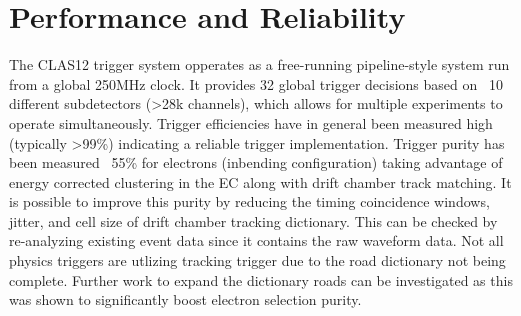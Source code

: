 \section{Performance and Reliability}

The CLAS12 trigger system opperates as a free-running pipeline-style system run from a global 250MHz clock. It provides 32 global trigger decisions based on ~10 different subdetectors (>28k channels), which allows for multiple experiments to operate simultaneously. Trigger efficiencies have in general been measured high (typically >99\%) indicating a reliable trigger implementation. Trigger purity has been measured ~55\% for electrons (inbending configuration) taking advantage of energy corrected clustering in the EC along with drift chamber track matching. It is possible to improve this purity by reducing the timing coincidence windows, jitter, and cell size of drift chamber tracking dictionary. This can be checked by re-analyzing existing event data since it contains the raw waveform data. Not all physics triggers are utlizing tracking trigger due to the road dictionary not being complete. Further work to expand the dictionary roads can be investigated as this was shown to significantly boost electron selection purity.
